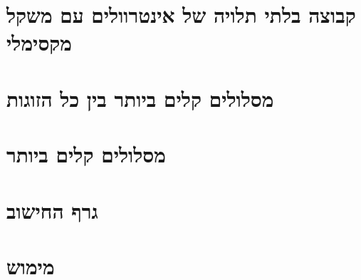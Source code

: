 \documentclass[]{article}
\begin{document}
	



\section*{קבוצה בלתי תלויה של אינטרוולים עם משקל מקסימלי}

\section*{מסלולים קלים ביותר בין כל הזוגות}

\section*{מסלולים קלים ביותר}

\section*{גרף החישוב}

\section*{מימוש}
\end{document}
